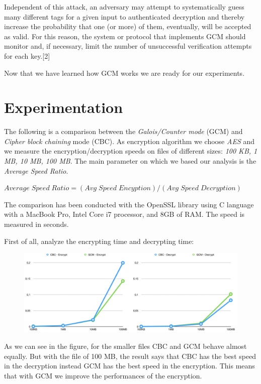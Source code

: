 \documentclass[11pt]{article}
\begin{document}
Independent of this attack, an adversary may attempt to systematically guess many different tags for a given input to authenticated decryption and thereby increase the probability that one (or more) of them, eventually, will be accepted as valid. For this reason, the system or protocol that implements GCM should monitor and, if necessary, limit the number of unsuccessful verification attempts for each key.[2]

Now that we have learned how GCM works we are ready for our experiments.

\section{Experimentation}
The following is a comparison between the {\em Galois/Counter mode} (GCM) and {\em Cipher block chaining} mode (CBC). As encryption algorithm we choose {\em AES} and we measure the encryption/decryption speeds on files of different sizes: {\em 100 KB, 1 MB, 10 MB, 100 MB}. The main parameter on which we based our analysis is the {\em Average Speed Ratio}.

\bigskip
$ Average\;Speed\;Ratio = (Avg\;Speed\;Encyption)/(Avg\;Speed\;Decryption) $
\bigskip

The comparison has been conducted with the OpenSSL library using C language with a MacBook Pro, Intel Core i7 processor, and 8GB of RAM. The speed is measured in seconds.

First of all, analyze the encrypting time and decrypting time:

\begin{figure}[hbt!]
  \centering
  \includegraphics[width=1\textwidth]{pic6-hw3-1635747}
  \label{fig:enc-dec speed}
\end{figure}

As we can see in the figure, for the smaller files CBC and GCM behave almost equally. But with the file of 100 MB, the result says that CBC has the best speed in the decryption instead GCM has the best speed in the encryption. This means that with GCM we improve the performances of the encryption.
\end{document}
